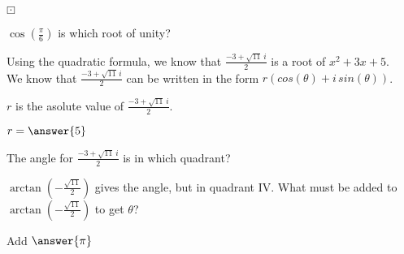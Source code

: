 \documentclass{ximera}
\begin{document}
\begin{question} $\boxdot$

$\cos\left( \frac{\pi}{6} \right)$ is which root of unity?

\begin{multipleChoice}
\end{multipleChoice}

\end{question}







\begin{example}


Using the quadratic formula, we know that $\frac{-3 + \sqrt{11} \, i}{2}$ is a root of $x^2 + 3x + 5$. \\

We know that $\frac{-3 + \sqrt{11} \, i}{2}$ can be written in the form $r (cos(\theta) + i \, sin(\theta))$.

$r$ is the asolute value of $\frac{-3 + \sqrt{11} \, i}{2}$.

$r = \answer{5}$ 

The angle for $\frac{-3 + \sqrt{11} \, i}{2}$ is in which quadrant?


\begin{multipleChoice}
\end{multipleChoice}


$\arctan\left( -\frac{\sqrt{11}}{2} \right)$ gives the angle, but in quadrant IV.  What must be added to $\arctan\left( -\frac{\sqrt{11}}{2} \right)$ to get $\theta$?

Add $\answer{\pi}$





\end{example}
\end{document}
